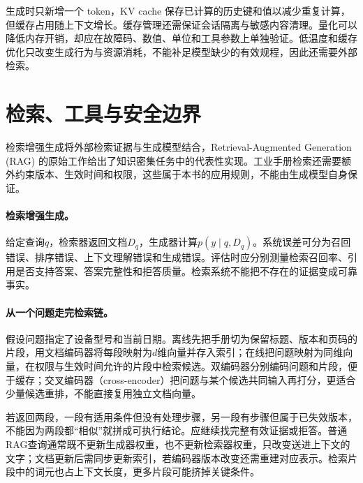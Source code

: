 生成时只新增一个 token，KV cache 保存已计算的历史键和值以减少重复计算，但缓存占用随上下文增长。缓存管理还需保证会话隔离与敏感内容清理。量化可以降低内存开销，却应在故障码、数值、单位和工具参数上单独验证。低温度和缓存优化只改变生成行为与资源消耗，不能补足模型缺少的有效规程，因此还需要外部检索。

\section{检索、工具与安全边界}
检索增强生成将外部检索证据与生成模型结合，Retrieval-Augmented Generation (RAG) 的原始工作给出了知识密集任务中的代表性实现\cite{lewis2020rag}。工业手册检索还需要额外约束版本、生效时间和权限，这些属于本书的应用规则，不能由生成模型自身保证。
\paragraph{检索增强生成。}
给定查询$q$，检索器返回文档$D_q$，生成器计算$p(y\mid q,D_q)$。系统误差可分为召回错误、排序错误、上下文理解错误和生成错误。评估时应分别测量检索召回率、引用是否支持答案、答案完整性和拒答质量。检索系统不能把不存在的证据变成可靠事实。

\paragraph{从一个问题走完检索链。}
假设问题指定了设备型号和当前日期。离线先把手册切为保留标题、版本和页码的片段，用文档编码器将每段映射为$d$维向量并存入索引；在线把问题映射为同维向量，在权限与生效时间允许的片段中检索候选。双编码器分别编码问题和片段，便于缓存；交叉编码器（cross-encoder）把问题与某个候选共同输入再打分，更适合少量候选重排，不能直接复用独立文档向量。

若返回两段，一段有适用条件但没有处理步骤，另一段有步骤但属于已失效版本，不能因为两段都“相似”就拼成可执行结论。应继续找完整有效证据或拒答。普通RAG查询通常既不更新生成器权重，也不更新检索器权重，只改变送进上下文的文字；文档更新后需同步更新索引，若编码器版本改变还需重建对应表示。检索片段中的词元也占上下文长度，更多片段可能挤掉关键条件。

